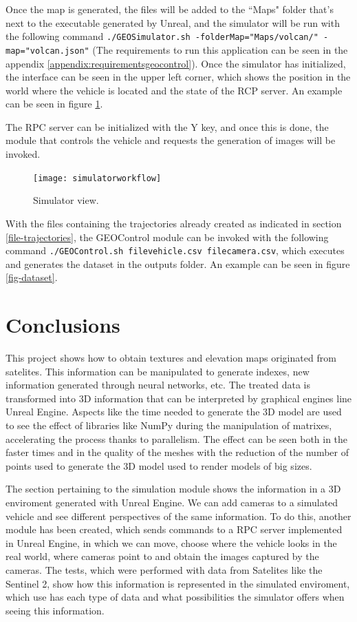 \documentclass[10pt,a4paper,twocolumn,twoside]{article}
\begin{document}
Once the map is generated, the files will be added to the ``Maps" folder that's next to the executable generated by Unreal, and the simulator will be run with the following command {\tt ./GEOSimulator.sh -folderMap="Maps/volcan/" -map="volcan.json"} (The requirements to run this application can be seen in the appendix \ref{appendix:requirementsgeocontrol}). Once the simulator has initialized, the interface can be seen in the upper left corner, which shows the position in the world where the vehicle is located and the state of the RCP server. An example can be seen in figure \ref{fig-workflowsimulator}.

The RPC server can be initialized with the Y key, and once this is done, the module that controls the vehicle and requests the generation of images will be invoked.

\begin{figure}[!h]
\centering
  	\texttt{[image: simulatorworkflow]}
	\caption{Simulator view.}
	\label{fig-workflowsimulator}
\end{figure}

With the files containing the trajectories already created as indicated in section \ref{file-trajectories}, the GEOControl module can be invoked with the following command {\tt ./GEOControl.sh filevehicle.csv filecamera.csv}, which executes and generates the dataset in the outputs folder. An example can be seen in figure \ref{fig-dataset}.

\section{Conclusions}

This project shows how to obtain textures and elevation maps originated from satelites. This information can be manipulated to generate indexes, new information generated through neural networks, etc. The treated data is transformed into 3D information that can be interpreted by graphical engines line Unreal Engine. Aspects like the time needed to generate the 3D model are used to see the effect of libraries like NumPy during the manipulation of matrixes, accelerating the process thanks to parallelism. The effect can be seen both in the faster times and in the quality of the meshes with the reduction of the number of points used to generate the 3D model used to render models of big sizes.

The section pertaining to the simulation module shows the information in a 3D enviroment generated with Unreal Engine. We can add cameras to a simulated vehicle and see different perspectives of the same information. To do this, another module has been created, which sends commands to a RPC server implemented in Unreal Engine, in which we can move, choose where the vehicle looks in the real world, where cameras point to and obtain the images captured by the cameras.
The tests, which were performed with data from Satelites like the Sentinel 2, show how this information is represented in the simulated enviroment, which use has each type of data and what possibilities the simulator offers when seeing this information.
\end{document}
